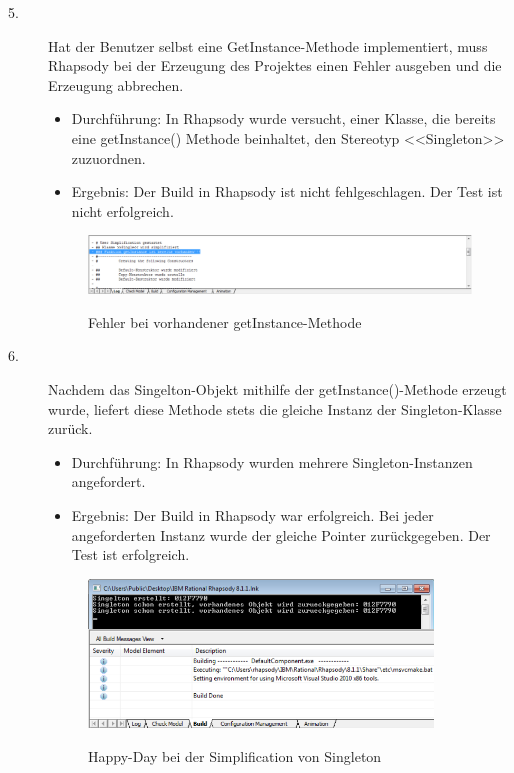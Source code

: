 \begin{description}
  \item[5.]
  Hat der Benutzer selbst eine GetInstance-Methode implementiert, muss Rhapsody bei der Erzeugung des Projektes einen Fehler ausgeben und die Erzeugung abbrechen.
  \begin{itemize}
  \item{Durchführung:}
  In Rhapsody wurde versucht, einer Klasse, die bereits eine getInstance()
  Methode beinhaltet, den Stereotyp <<Singleton>> zuzuordnen.
  \item{Ergebnis:}
  Der Build in Rhapsody ist nicht fehlgeschlagen. Der Test ist nicht
  erfolgreich.
  \end{itemize}
  \begin{figure}[!htbp]
	\centering
	\includegraphics[width=0.999\textwidth]{content/pictures/tests/singleton/getinstanceerror1}
	\label{pic:bild}
	\caption{Fehler bei vorhandener getInstance-Methode}
\end{figure}

  \item[6.]
  Nachdem das Singelton-Objekt mithilfe der getInstance()-Methode erzeugt wurde, liefert diese Methode stets die gleiche Instanz der Singleton-Klasse zurück. 
  \begin{itemize}
  	\item{Durchführung:}
  	In Rhapsody wurden mehrere Singleton-Instanzen angefordert.
  	\item{Ergebnis:}
  	Der Build in Rhapsody war erfolgreich. Bei jeder angeforderten Instanz
  	wurde der gleiche Pointer zurückgegeben. Der Test ist erfolgreich.
  \end{itemize} 
  \begin{figure}[!htbp]
	\centering
	\includegraphics[width=0.9\textwidth]{content/pictures/tests/singleton/HappyDay1}
	\label{pic:bild}
	\caption{Happy-Day bei der Simplification von Singleton}
\end{figure}
 
\end{description}

